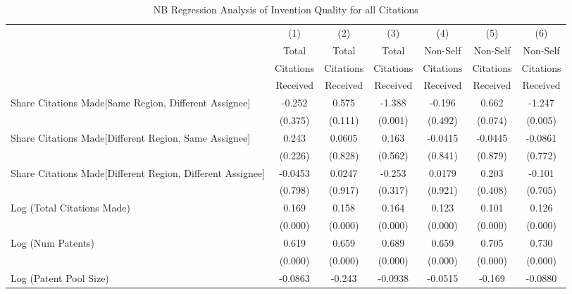 \begin{table}[htbp]\centering \caption{NB Regression Analysis of Invention Quality for all Citations \label{a.e.o.t.n.model123192021}} 
\scriptsize
\singlespacing
\begin{tabular}{l*{6}{c}} \hline\hline
                &\multicolumn{1}{c}{(1)}&\multicolumn{1}{c}{(2)}&\multicolumn{1}{c}{(3)}&\multicolumn{1}{c}{(4)}&\multicolumn{1}{c}{(5)}&\multicolumn{1}{c}{(6)}\\
                 &\multicolumn{1}{c}{Total}&\multicolumn{1}{c}{Total}&\multicolumn{1}{c}{Total}&\multicolumn{1}{c}{Non-Self}&\multicolumn{1}{c}{Non-Self}&\multicolumn{1}{c}{Non-Self}\\
                &\multicolumn{1}{c}{Citations}&\multicolumn{1}{c}{Citations}&\multicolumn{1}{c}{Citations}&\multicolumn{1}{c}{Citations}&\multicolumn{1}{c}{Citations}&\multicolumn{1}{c}{Citations}\\
                 &\multicolumn{1}{c}{Received}&\multicolumn{1}{c}{Received}&\multicolumn{1}{c}{Received}&\multicolumn{1}{c}{Received}&\multicolumn{1}{c}{Received}&\multicolumn{1}{c}{Received}\\
\hline
Share Citations Made[Same Region, Different Assignee]&   -0.252&    0.575&   -1.388&   -0.196&    0.662&   -1.247\\
                &  (0.375)&  (0.111)&  (0.001)&  (0.492)&  (0.074)&  (0.005)\\
Share Citations Made[Different Region, Same Assignee]&    0.243&   0.0605&    0.163&  -0.0415&  -0.0445&  -0.0861\\
                &  (0.226)&  (0.828)&  (0.562)&  (0.841)&  (0.879)&  (0.772)\\
Share Citations Made[Different Region, Different Assignee]&  -0.0453&   0.0247&   -0.253&   0.0179&    0.203&   -0.101\\
                &  (0.798)&  (0.917)&  (0.317)&  (0.921)&  (0.408)&  (0.705)\\
Log (Total Citations Made)&    0.169&    0.158&    0.164&    0.123&    0.101&    0.126\\
                &  (0.000)&  (0.000)&  (0.000)&  (0.000)&  (0.000)&  (0.000)\\
Log (Num Patents)&    0.619&    0.659&    0.689&    0.659&    0.705&    0.730\\
                &  (0.000)&  (0.000)&  (0.000)&  (0.000)&  (0.000)&  (0.000)\\
Log (Patent Pool Size)&  -0.0863&   -0.243&  -0.0938&  -0.0515&   -0.169&  -0.0880\\

\end{tabular}
\end{table}
